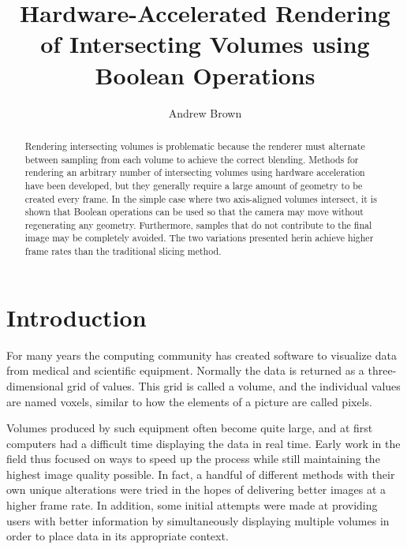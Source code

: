 \documentclass{report}
\begin{document}
\title{Hardware-Accelerated Rendering of Intersecting Volumes using Boolean Operations}
\author{Andrew Brown}

\beforepreface
\afterpreface

\begin{abstract}
Rendering intersecting volumes is problematic because the renderer must
alternate between sampling from each volume to achieve the correct blending.
Methods for rendering an arbitrary number of intersecting volumes using hardware
acceleration have been developed, but they generally require a large amount of
geometry to be created every frame.  In the simple case where two axis-aligned
volumes intersect, it is shown that Boolean operations can be used so that
the camera may move without regenerating any geometry.  Furthermore, samples
that do not contribute to the final image may be completely avoided.  The two
variations presented herin achieve higher frame rates than the traditional
slicing method.
\end{abstract}

\pagestyle{plain}

\chapter{Introduction}

For many years the computing community has created software to visualize data
from medical and scientific equipment.  Normally the data is returned as a
three-dimensional grid of values.  This grid is called a volume, and the
individual values are named voxels, similar to how the elements of a picture are
called pixels.

Volumes produced by such equipment often become quite large, and at first
computers had a difficult time displaying the data in real time.  Early work in
the field thus focused on ways to speed up the process while still maintaining
the highest image quality possible.  In fact, a handful of different methods
with their own unique alterations were tried in the hopes of delivering better
images at a higher frame rate.  In addition, some initial attempts were made at
providing users with better information by simultaneously displaying multiple
volumes in order to place data in its appropriate context.
\end{document}
